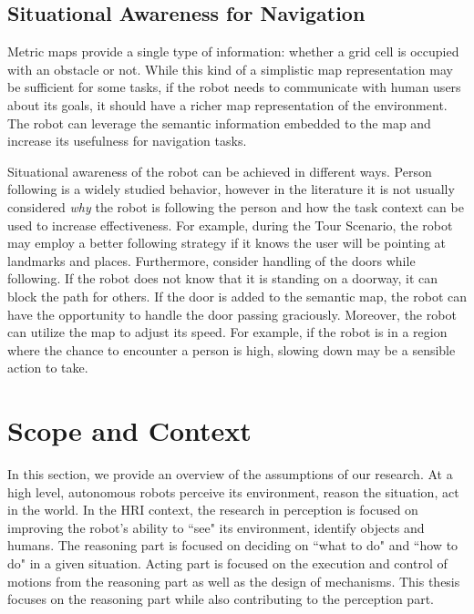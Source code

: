 \documentclass[12pt]{gatech-thesis}
\begin{document}
\subsection{Situational Awareness for Navigation}

Metric maps provide a single type of information: whether a grid cell is occupied with an obstacle or not. While this kind of a simplistic map representation may be sufficient for some tasks, if the robot needs to communicate with human users about its goals, it should have a richer map representation of the environment. The robot can leverage the semantic information embedded to the map and increase its usefulness for navigation tasks. %


Situational awareness of the robot can be achieved in different ways. Person following is a widely studied behavior, however in the literature it is not usually considered \textit{why} the robot is following the person and how the task context can be used to increase effectiveness. For example, during the Tour Scenario, the robot may employ a better following strategy if it knows the user will be pointing at landmarks and places. Furthermore, consider handling of the doors while following. If the robot does not know that it is standing on a doorway, it can block the path for others. If the door is added to the semantic map, the robot can have the opportunity to handle the door passing graciously. Moreover, the robot can utilize the map to adjust its speed. For example, if the robot is in a region where the chance to encounter a person is high, slowing down may be a sensible action to take.






\section{Scope and Context}

In this section, we provide an overview of the assumptions of our research.  At a high level, autonomous robots perceive its environment, reason the situation, act in the world. In the HRI context, the research in perception is focused on improving the robot's ability to ``see" its environment, identify objects and humans. The reasoning part is focused on deciding on ``what to do" and ``how to do" in a given situation. Acting part is focused on the execution and control of motions from the reasoning part as well as the design of mechanisms. This thesis focuses on the reasoning part while also contributing to the perception part.
\end{document}
